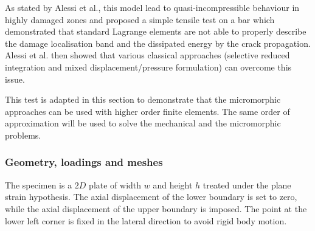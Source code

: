 As stated by Alessi et al., this model lead to quasi-incompressible
behaviour in highly damaged zones and proposed a simple tensile test on
a bar which demonstrated that standard Lagrange elements are not able to
properly describe the damage localisation band and the dissipated energy
by the crack propagation. Alessi et al. then showed that various
classical approaches (selective reduced integration and mixed
displacement/pressure formulation) can overcome this issue.

This test is adapted in this section to demonstrate that the
micromorphic approaches can be used with higher order finite elements.
The same order of approximation will be used to solve the mechanical and
the micromorphic problems.

\subsubsection{Geometry, loadings and meshes}

The specimen is a \(2D\) plate of width \(w\) and height \(h\) treated
under the plane strain hypothesis. The axial displacement of the lower
boundary is set to zero, while the axial displacement of the upper
boundary is imposed. The point at the lower left corner is fixed in the
lateral direction to avoid rigid body motion.



